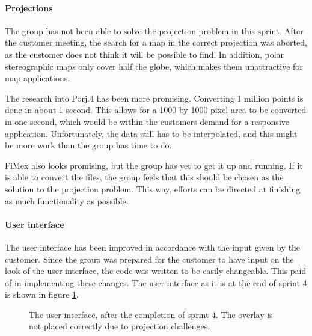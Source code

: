 \documentclass[11pt,a4paper,titlepage,oneside]{report}
\begin{document}
\paragraph{Projections}
The group has not been able to solve the projection problem in this sprint. After the customer meeting, the search for a map in the correct projection was aborted, as the customer does not think it will be possible to find. In addition, polar stereographic maps only cover half the globe, which makes them unattractive for map applications. 

The research into Porj.4 has been more promising. Converting 1 million points is done in about 1 second. This allows for a 1000 by 1000 pixel area to be converted in one second, which would be within the customers demand for a responsive application. Unfortunately, the data still has to be interpolated, and this might be more work than the group has time to do.

FiMex also looks promising, but the group has yet to get it up and running. If it is able to convert the files, the group feels that this should be chosen as the solution to the projection problem. This way, efforts can be directed at finishing as much functionality as possible. 

\paragraph{User interface}
The user interface has been improved in accordance with the input given by the customer. Since the group was prepared for the customer to have input on the look of the user interface, the code was written to be easily changeable. This paid of in implementing these changes. The user interface as it is at the end of sprint 4 is shown in figure \ref{fig:UIAfterSprint4}.

\begin{figure}[t]
\begin{center}
\caption{The user interface, after the completion of sprint 4. The overlay is not placed correctly due to projection challenges.}
\label{fig:UIAfterSprint4}
\end{center}
\end{figure}
\end{document}
